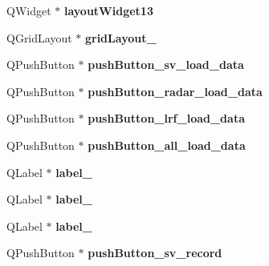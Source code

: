 \begin{DoxyCompactItemize}
\item 
\hypertarget{class_ui___main_window_a8a9479b398739afd841656f19dafca9e}{}Q\+Widget $\ast$ {\bfseries layout\+Widget13}\label{class_ui___main_window_a8a9479b398739afd841656f19dafca9e}

\item 
\hypertarget{class_ui___main_window_a63157bad53e80af9d929e38b532867a0}{}Q\+Grid\+Layout $\ast$ {\bfseries grid\+Layout\+\_}\label{class_ui___main_window_a63157bad53e80af9d929e38b532867a0}

\item 
\hypertarget{class_ui___main_window_a4c8544db44765ebe65de4347d6e8bbdb}{}Q\+Push\+Button $\ast$ {\bfseries push\+Button\+\_\+sv\+\_\+load\+\_\+data}\label{class_ui___main_window_a4c8544db44765ebe65de4347d6e8bbdb}

\item 
\hypertarget{class_ui___main_window_a15df4e8368a9089c7529575836483ffa}{}Q\+Push\+Button $\ast$ {\bfseries push\+Button\+\_\+radar\+\_\+load\+\_\+data}\label{class_ui___main_window_a15df4e8368a9089c7529575836483ffa}

\item 
\hypertarget{class_ui___main_window_ac828745b1bd3c0f85df5a14bccd92bf1}{}Q\+Push\+Button $\ast$ {\bfseries push\+Button\+\_\+lrf\+\_\+load\+\_\+data}\label{class_ui___main_window_ac828745b1bd3c0f85df5a14bccd92bf1}

\item 
\hypertarget{class_ui___main_window_a910b27be17d3d149a32c839d30d7ee9c}{}Q\+Push\+Button $\ast$ {\bfseries push\+Button\+\_\+all\+\_\+load\+\_\+data}\label{class_ui___main_window_a910b27be17d3d149a32c839d30d7ee9c}

\item 
\hypertarget{class_ui___main_window_a438102703ff7e65b133ba3760663d554}{}Q\+Label $\ast$ {\bfseries label\+\_}\label{class_ui___main_window_a438102703ff7e65b133ba3760663d554}

\item 
\hypertarget{class_ui___main_window_aeac219c7deb5536d53d995dc14fdfa06}{}Q\+Label $\ast$ {\bfseries label\+\_}\label{class_ui___main_window_aeac219c7deb5536d53d995dc14fdfa06}

\item 
\hypertarget{class_ui___main_window_ac29bb936878b755592a990262bf1ee6d}{}Q\+Label $\ast$ {\bfseries label\+\_}\label{class_ui___main_window_ac29bb936878b755592a990262bf1ee6d}

\item 
\hypertarget{class_ui___main_window_a794b2054349951c82d6eb3c523f3dfb8}{}Q\+Push\+Button $\ast$ {\bfseries push\+Button\+\_\+sv\+\_\+record}\label{class_ui___main_window_a794b2054349951c82d6eb3c523f3dfb8}


\end{DoxyCompactItemize}
